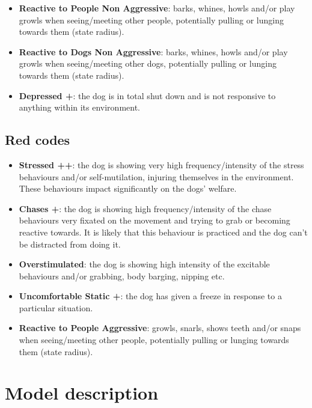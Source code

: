 \documentclass[12pt]{article}
\begin{document}
\begin{itemize}
  \item \textbf{Reactive to People Non Aggressive}: barks, whines, howls and/or play growls when seeing/meeting other people, potentially pulling or lunging towards them (state radius).
  \item \textbf{Reactive to Dogs Non Aggressive}: barks, whines, howls and/or play growls when seeing/meeting other dogs, potentially pulling or lunging towards them (state radius).
  \item \textbf{Depressed +}: the dog is in total shut down and is not responsive to anything
  within its environment.
\end{itemize}

\subsection{Red codes}

\begin{itemize}
  \item \textbf{Stressed ++}: the dog is showing very high frequency/intensity of the stress behaviours and/or self-mutilation, injuring themselves in the environment. These behaviours impact significantly on the dogs’ welfare.
  \item \textbf{Chases +}: the dog is showing high frequency/intensity of the chase behaviours very fixated on the movement and trying to grab or becoming reactive towards. It is likely that this behaviour is practiced and the dog can’t be distracted from doing it.
  \item \textbf{Overstimulated}: the dog is showing high intensity of the excitable behaviours and/or grabbing, body barging, nipping etc.
  \item \textbf{Uncomfortable Static +}: the dog has given a freeze in response to a particular situation.
  \item \textbf{Reactive to People Aggressive}: growls, snarls, shows teeth and/or snaps when seeing/meeting other people, potentially pulling or lunging towards them (state radius).

\end{itemize}
\newpage

\section{Model description}

\newpage
\end{document}
